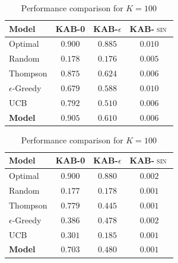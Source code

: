 \begin{table}[H]
\centering
\caption{Performance comparison for $K=100$}
\label{tab:k200}
\begin{tabular}{l c c c}
\toprule
\textbf{Model} & \textbf{\textsc{KAB-0}} & \textbf{\textsc{KAB-$\epsilon$}} & \textbf{\textsc{KAB-$\sin$}} \\
\midrule
Optimal & $0.900$ & $0.885$ & $0.010$  \\
Random & $0.178$ & $0.176$ & $0.005$ \\
\midrule
Thompson & $0.875$ & $0.624$ & $0.006$ \\
$\epsilon$-Greedy & $0.679$ & $0.588$ & $0.010$ \\
UCB & $0.792$ & $0.510$ & $0.006$ \\
\textbf{Model} & $\mathbf{0.905}$ & $\mathbf{0.610}$ & $\mathbf{0.006}$  \\
\bottomrule
\end{tabular}
\end{table}

\begin{table}[H]
\centering
\caption{Performance comparison for $K=100$}
\label{tab:k1000}
\begin{tabular}{l c c c}
\toprule
\textbf{Model} & \textbf{\textsc{KAB-0}} & \textbf{\textsc{KAB-$\epsilon$}} & \textbf{\textsc{KAB-$\sin$}} \\
\midrule
Optimal & $0.900$ & $0.880$ & $0.002$  \\
Random & $0.177$ & $0.178$ & $0.001$ \\
\midrule
Thompson & $0.779$ & $0.445$ & $0.001$ \\
$\epsilon$-Greedy & $0.386$ & $0.478$ & $0.002$ \\
UCB & $0.301$ & $0.185$ & $0.001$ \\
\textbf{Model} & $\mathbf{0.703}$ & $\mathbf{0.480}$ & $\mathbf{0.001}$  \\
\bottomrule
\end{tabular}
\end{table}


\newpage
